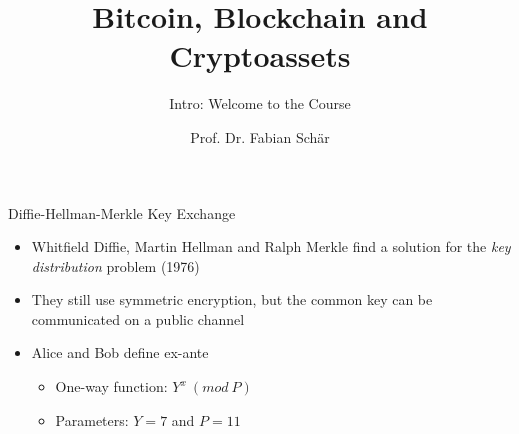 \documentclass[]{beamer}
\title{Bitcoin, Blockchain and Cryptoassets}
\subtitle{Intro: Welcome to the Course}
\author{Prof. Dr. Fabian Schär}
\institute{University of Basel}
\begin{document}
\thispagestyle{empty}
\begin{frame}[noframenumbering]
	\titlepage
\end{frame}

\begin{frame}{Diffie-Hellman-Merkle Key Exchange}
	\begin{itemize}
		\item<1-> Whitfield Diffie, Martin Hellman and Ralph Merkle find a solution for the \textit{key distribution} problem (1976)
		\item<2-> They still use symmetric encryption, but the common key can be communicated on a public channel
		\vspace{0.5cm}
		\item<3-> Alice and Bob define ex-ante
		\begin{itemize}
			\item<4-> One-way function: \(Y^x\ (mod\ P)\)
			\item<5-> Parameters: \(Y = 7\) and \(P = 11\)
		\end{itemize}
	\end{itemize}
\end{frame}
\end{document}
